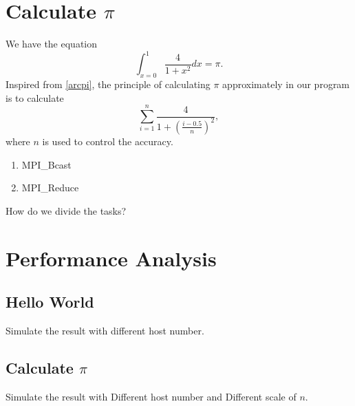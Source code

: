 \documentclass{sig-alternate-05-2015}
\begin{document}
\section{Calculate $\pi$}\label{pi}
We have the equation
\begin{equation}\label{arcpi}
 \int_{x=0}^{1}\frac{4}{1+x^2}dx=\pi.
\end{equation}
Inspired from \eqref{arcpi}, the principle of calculating $\pi$ approximately in our program is to calculate
\begin{equation}
 \sum\limits_{i=1}^{n}\frac{4}{1+\left(\frac{i-0.5}{n}\right)^2},
\end{equation}
where $n$ is used to control the accuracy.

\begin{enumerate}
 \item MPI\_Bcast
 \item MPI\_Reduce
\end{enumerate}

How do we divide the tasks?
 
\section{Performance Analysis}\label{ana}
\subsection{Hello World}
Simulate the result with different host number.

\subsection{Calculate $\pi$}
Simulate the result with Different host number and Different scale of $n$.
%
%  
\end{document}
